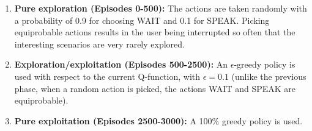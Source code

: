         \begin{enumerate}
        	\item \textbf{Pure exploration (Episodes 0-500):} The actions are taken randomly with a probability of 0.9 for choosing WAIT and 0.1 for SPEAK. Picking equiprobable actions results in the user being interrupted so often that the interesting scenarios are very rarely explored.
            \item \textbf{Exploration/exploitation (Episodes 500-2500):} An $\epsilon$-greedy policy is used with respect to the current Q-function, with $\epsilon=0.1$ (unlike the previous phase, when a random action is picked, the actions WAIT and SPEAK are equiprobable).
            \item \textbf{Pure exploitation (Episodes 2500-3000):} A 100\% greedy policy is used.
        \end{enumerate}
				

